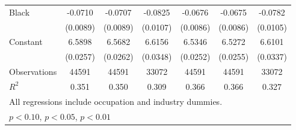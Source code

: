 {\begin{longtable}{l*{6}{c}}
Black               &     -0.0710\sym{***}&     -0.0707\sym{***}&     -0.0825\sym{***}&     -0.0676\sym{***}&     -0.0675\sym{***}&     -0.0782\sym{***}\\
                    &    (0.0089)         &    (0.0089)         &    (0.0107)         &    (0.0086)         &    (0.0086)         &    (0.0105)         \\
Constant            &      6.5898\sym{***}&      6.5682\sym{***}&      6.6156\sym{***}&      6.5346\sym{***}&      6.5272\sym{***}&      6.6101\sym{***}\\
                    &    (0.0257)         &    (0.0262)         &    (0.0348)         &    (0.0252)         &    (0.0255)         &    (0.0337)         \\
\hline  
Observations        &       44591         &       44591         &       33072         &       44591         &       44591         &       33072         \\
\(R^{2}\)           &       0.351         &       0.350         &       0.309         &       0.366         &       0.366         &       0.327         \\
\hline  
\multicolumn{7}{l}{\footnotesize All regressions include occupation and industry dummies.}\\
\multicolumn{7}{l}{\footnotesize \sym{*} \(p<0.10\), \sym{**} \(p<0.05\), \sym{***} \(p<0.01\)}\\
\end{longtable}
}
